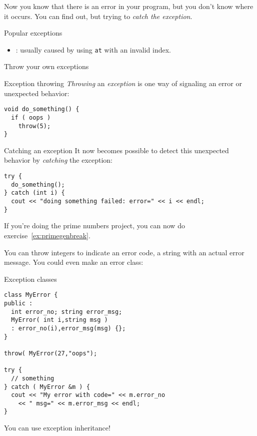 Now you know that there is an error in your program, but
you don't know where it occurs.
You can find out, but trying to
\emph{catch the exception}.


 {Popular exceptions}

\begin{itemize}
\item {}: usually caused by using \lstinline{at}
  with an invalid index.
\end{itemize}

 {Throw your own exceptions}
\label{sec:except-throw}

\begin{block}{Exception throwing}
  \label{sl:exception-throw}
  \emph{Throwing} an \emph{exception} is one way of signaling an error or
  unexpected behavior:
\begin{lstlisting}
void do_something() {
  if ( oops )
    throw(5);
}
\end{lstlisting}
\end{block}

\begin{block}{Catching an exception}
  \label{sl:exception-catch}
  It now becomes possible to detect this unexpected behavior by
  \emph{catching}
  the exception:
\begin{lstlisting}
try {
  do_something();
} catch (int i) {
  cout << "doing something failed: error=" << i << endl;
}
\end{lstlisting}
\end{block}

If you're doing the prime numbers project, you can now
do exercise~\ref{ex:primegenbreak}.

You can throw integers to indicate an error code, a string with an
actual error message. You could even make an error class:

\begin{block}{Exception classes}
  \label{sl:exception-class}
\begin{lstlisting}
class MyError {
public :
  int error_no; string error_msg;
  MyError( int i,string msg )
  : error_no(i),error_msg(msg) {};
}

throw( MyError(27,"oops");

try {
  // something
} catch ( MyError &m ) {
  cout << "My error with code=" << m.error_no
    << " msg=" << m.error_msg << endl;
}
\end{lstlisting}
You can use exception inheritance!
\end{block}

